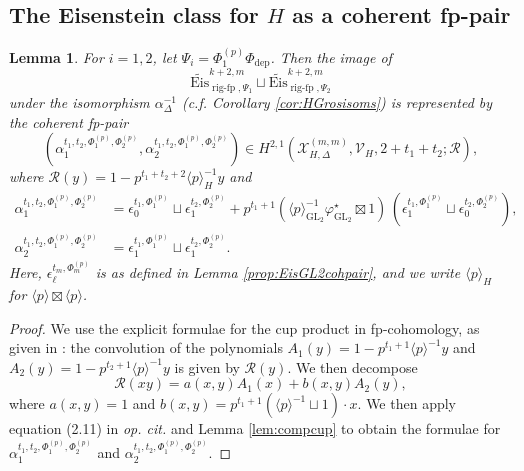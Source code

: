 \documentclass[cjm]{ipart}
\theoremstyle{plain}
\newtheorem{lemma}[theorem]{Lemma}
\theoremstyle{remark}
\DeclareMathOperator{\GL}{GL}
\DeclareMathOperator{\rigfp}{rig-fp}
\newcommand{\Eis}{\mathrm{Eis}}
\newcommand{\cR}{\mathcal{R}}
\newcommand{\cV}{\mathcal{V}}
\newcommand{\cX}{\mathcal{X}}
\newcommand{\dep}{\mathrm{dep}}
\numberwithin{equation}{subsection}
\begin{document}

\subsection{The Eisenstein class for $H$ as a coherent fp-pair}\label{ssec:Eiscohfppair}


\begin{lemma}\label{lem:HEisclassasfppair}
 For $i=1,2$, let $\Psi_i=\Phi^{(p)}_1\Phi_{\dep}$. Then the image of
 \[  \widetilde{\Eis}_{\rigfp,\Psi_1}^{k+2,m}\sqcup \widetilde{\Eis}_{\rigfp,\Psi_2}^{k+2,m}\]
 under the isomorphism $\alpha_\Delta^{-1}$ (c.f. Corollary \ref{cor:HGrosisoms}) is represented by the coherent fp-pair
 \[ \left( \alpha^{t_1,t_2, \Phi^{(p)}_1,\Phi^{(p)}_2}_1,\alpha^{t_1,t_2,\Phi^{(p)}_1,\Phi^{(p)}_2}_2\right)\in H^{2,1}\left(\cX^{(m,m)}_{H,\Delta},\cV_H,2+t_1+t_2;\cR\right),\]
 where $\cR(y)=1-p^{t_1+t_2+2}\langle p\rangle_H^{-1}y$ and
 \begin{align}
  \alpha^{t_1,t_2,\Phi^{(p)}_1,\Phi^{(p)}_2}_1 &= \epsilon^{t_1,\Phi^{(p)}_1}_0\sqcup \epsilon^{t_2,\Phi^{(p)}_2}_1 + p^{t_1+1}( \langle p\rangle^{-1}_{\GL_2} \varphi_{\GL_2}^\star\boxtimes 1)\, \left(\epsilon^{t_1,\Phi^{(p)}_1}_1\sqcup \epsilon^{t_2,\Phi^{(p)}_2}_0\right),\\
  \alpha^{t_1,t_2,\Phi^{(p)}_1,\Phi^{(p)}_2}_2 & =  \epsilon^{t_1,\Phi^{(p)}_1}_1\sqcup \epsilon^{t_2,\Phi^{(p)}_2}_1.
 \end{align}
 Here, $\epsilon_\ell^{t_m,\Phi^{(p)}_m}$ is as defined in Lemma \ref{prop:EisGL2cohpair}, and we write $\langle p\rangle_H$ for $\langle p\rangle\boxtimes \langle p\rangle$.
\end{lemma}\begin{proof}
 We use the explicit formulae for the cup product in fp-cohomology, as given in \cite[eq. (2.10)]{besser12}: the convolution of the polynomials $A_1(y)=1-p^{t_1+1}\langle p\rangle^{-1} y$ and $A_2(y)=1-p^{t_2+1}\langle p\rangle^{-1} y$ is given by $\cR(y)$. We then decompose
 \[ \cR(xy)=a(x,y)A_1(x)+b(x,y)A_2(y),\]
 where $a(x,y)=1$ and $b(x,y)=p^{t_1+1}(\langle p\rangle^{-1}\sqcup 1)\cdot x$. We then apply equation (2.11) in \emph{op. cit.} and  Lemma \ref{lem:compcup} to obtain the formulae for $ \alpha^{t_1,t_2,\Phi^{(p)}_1,\Phi^{(p)}_2}_1$ and $\alpha^{t_1,t_2,\Phi^{(p)}_1,\Phi^{(p)}_2}_2$.
\end{proof}
\end{document}
